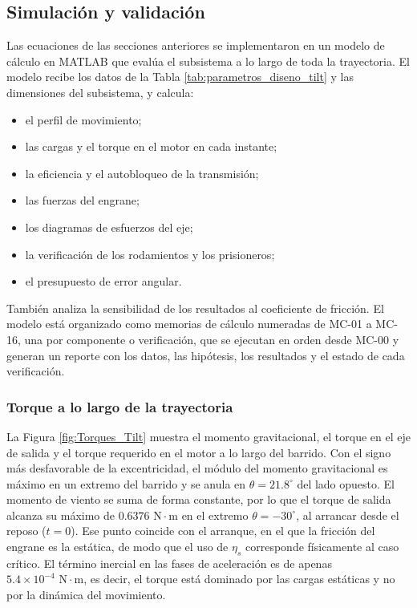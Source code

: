\documentclass[../../General.tex]{subfiles}
\begin{document}
\subsection{Simulación y validación}

Las ecuaciones de las secciones anteriores se implementaron en un modelo de cálculo en MATLAB que evalúa el subsistema a lo largo de toda la trayectoria. El modelo recibe los datos de la Tabla \ref{tab:parametros_diseno_tilt} y las dimensiones del subsistema, y calcula:
\begin{itemize}
    \item el perfil de movimiento;
    \item las cargas y el torque en el motor en cada instante;
    \item la eficiencia y el autobloqueo de la transmisión;
    \item las fuerzas del engrane;
    \item los diagramas de esfuerzos del eje;
    \item la verificación de los rodamientos y los prisioneros;
    \item el presupuesto de error angular.
\end{itemize}
También analiza la sensibilidad de los resultados al coeficiente de fricción. El modelo está organizado como memorias de cálculo numeradas de MC-01 a MC-16, una por componente o verificación, que se ejecutan en orden desde MC-00 y generan un reporte con los datos, las hipótesis, los resultados y el estado de cada verificación.

\subsubsection{Torque a lo largo de la trayectoria}

La Figura \ref{fig:Torques_Tilt} muestra el momento gravitacional, el torque en el eje de salida y el torque requerido en el motor a lo largo del barrido. Con el signo más desfavorable de la excentricidad, el módulo del momento gravitacional es máximo en un extremo del barrido y se anula en $\theta = 21.8^\circ$ del lado opuesto. El momento de viento se suma de forma constante, por lo que el torque de salida alcanza su máximo de $0.6376\text{ N}\cdot\text{m}$ en el extremo $\theta = -30^\circ$, al arrancar desde el reposo ($t = 0$). Ese punto coincide con el arranque, en el que la fricción del engrane es la estática, de modo que el uso de $\eta_s$ corresponde físicamente al caso crítico. El término inercial en las fases de aceleración es de apenas $5.4 \times 10^{-4}\text{ N}\cdot\text{m}$, es decir, el torque está dominado por las cargas estáticas y no por la dinámica del movimiento.
\end{document}
